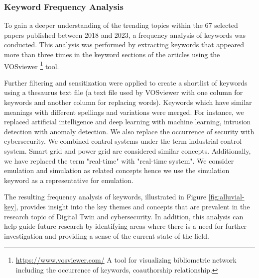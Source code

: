 \subsubsection*{Keyword Frequency Analysis}
To gain a deeper understanding of the trending topics within the 67 selected papers published between 2018 and 2023, a frequency analysis of keywords was conducted. This analysis was performed by extracting keywords that appeared more than three times in the keyword sections of the articles using the VOSviewer \footnote{\url{https://www.vosviewer.com/} A tool for visualizing bibliometric network including the occurrence of keywords, coauthorship relationship.} tool. 

Further filtering and sensitization were applied to create a shortlist of keywords using a thesaurus text file (a text file used by VOSviewer with one column for keywords and another column for replacing words). Keywords which have similar meanings with different spellings and variations were merged. For instance, we replaced artificial intelligence and deep learning with machine learning, intrusion detection with anomaly detection. We also replace the occurrence of security with cybersecurity. We combined control systems under the term industrial control system. Smart grid and power grid are considered similar concepts. Additionally, we have replaced the term "real-time" with "real-time system". We consider emulation and simulation as related concepts hence we use the simulation keyword as a representative for emulation. 

The resulting frequency analysis of keywords, illustrated in Figure \ref{fig:alluvial-key}, provides insight into the key themes and concepts that are prevalent in the research topic of Digital Twin and cybersecurity. In addition, this analysis can help guide future research by identifying areas where there is a need for further investigation and providing a sense of the current state of the field.

